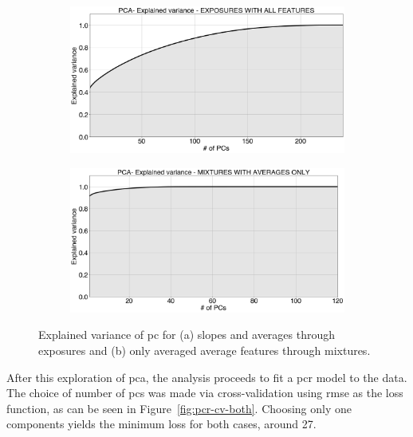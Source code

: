\begin{figure}[!htb]
	\centering

	\begin{subfigure}[t]{0.5\textwidth}
		\includegraphics[width=1\linewidth]{../figures/pcr-explained-variance.png}
		\caption{}
		\label{fig:pca-exp-var} 
	\end{subfigure}
	
	\begin{subfigure}[t]{0.5\textwidth}
		\includegraphics[width=1\linewidth]{../figures/pcr-explained-variance-avg-feat.png}
		\caption{}
		\label{fig:pca-exp-var-averaged}
	\end{subfigure}
	
	\caption{Explained variance of \acrshort{pc} for (a) slopes and averages through exposures and (b) only averaged average features through mixtures.}
	\label{fig:pca-exp-var-both}
\end{figure}

After this exploration of \acrshort{pca}, the analysis proceeds to fit a \acrshort{pcr} model to the data. The choice of number of \acrshort{pc}s was made via cross-validation using \acrshort{rmse} as the loss function, as can be seen in Figure~\ref{fig:pcr-cv-both}. Choosing only one components yields the minimum loss for both cases, around 27.

